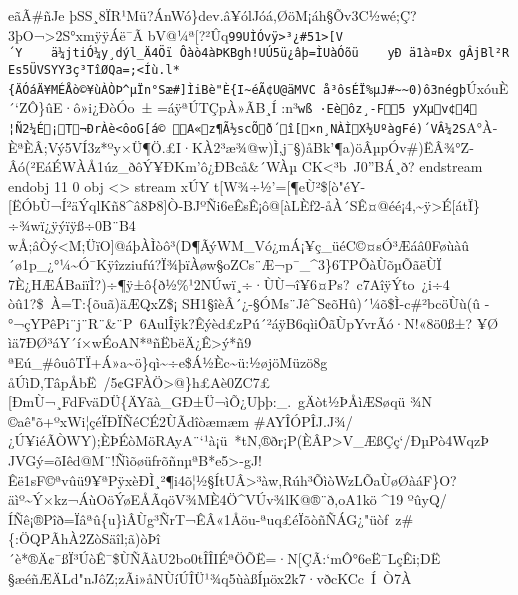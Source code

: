 \documentclass[
]{article}
\begin{document}
{eã\)Ã\#ñJe ­þSS¸8Ï­R¹Mü?ÁnWó\}dev.â¥ólJóá,ØöM¡áh§Õv3C½wé;Ç?3þO¬\textgreater2S°xmÿÿÁë¯Ã
bV@¼ª{[}?²Ûq\texttt{99UÌÓvÿ\textgreater{}³¿\#5\textquotesingle{}1\textgreater{}{[}V´Y\ \ \ \ ä¼jtiÓ¼y¸dýl\_Ä4Öï~Ôàò4àÞKBgh!UÚ5ü¿âþ=ÌUàÓõü\ \ \ \ yÐ\ ä1à¤Ðx\ gÂjBl²REs5ÜVSYY3ç³TîØQa=;\textless{}\textquotesingle{}Íù.l*\{ÄÓáÄ¥MÉÅò©¥ùÀÒ Þ\^{}µÏn°Sæ\#{]}ÌiBè"È\{I\textasciitilde{}éÃ¢U@äMVC\ å³ôsÉÏ\%µJ\#\textasciitilde{}\textasciitilde{}0)ô3négþ}ÚxóuÈ´`ZÔ\}ûE·ô»i¿ÐòÓo~± =áÿªÚTÇpÀ»ÃB¸Í :n³\texttt{wß\ ·Eèôz¸-F\textbar{}5~yXµv¢4¦Ñ2¼É¡T¬ÐrÀè\textless{}ôoG{[}á©~A«z¶Ã½scÕð´î{[}×n¸NÀÌX½UºàgFé)´VÂ¼2S}A°À­ÈªÈÂ;Vý5VÍ3z*ºy×Ü¶Ö.£I·KÀ2³æ¾@w)Ì,j¯§)åBk'­¶a)öÂµpÓv\#)ËÂ¾°Z­Âó(²EáÉWÀÅ1úz\_ðôÝ¥ÐKm'ô¿ÐBcå \&´WÀµ
 CK\textless³b~J0''BÁ¸ð?
endstream
endobj
11 0 obj
\textless{}\textgreater{}
stream
xÚY t{[}W¾÷½'={[}¶eÙ²\${[}ò"éY-{[}ËÓbÙ¬Í²äÝqlKñ8\^{}â8Þ8{]}Ò-BJºÑi6\textquotesingle eÊsÊ¡ô@{[}àLÈf2-åÀ´SÊ¤@éé¡4,\textasciitildeÿ\textgreater É{[}átÏ\}÷¾wï¿\textbar ÿýïÿß÷0B¨B4
wÅ;âÒý\textless M;ÜïO{]}@\textquotesingle áþÀÌòô³(D¶ÃýWM\_Vó¿mÁ¡¥ç\_üéC©¤sÓ³Æá\textquotesingle â0Føùàû´ø1p\_¿°¼\textasciitilde Ó¯Kÿîzziufú?Ï¾þïÀøw§oZCs¨Æ¬p¯\_\^{}3\}6TPÕàÙõµÕãëÙÏ 7È¿HÆÁBaiïÌ?)÷¶ÿ±ô\{ð½\%¹2NÚwï¸÷·ÙÙ¬î¥6¤Ps?~c7AîÿÝto~¿i÷4
òû1?\$~À=T:\{õuã)äÆQxZ\$¡ SH1§îèÂ´¿-§ÓMs¨Jê\^{}S¢õHû)´¼õ\$Ì\textbar{}-c\#²bcöÙ­ù(û -°¬çYP êPi¨j¨R¨\&¨P~6AulÎÿk?Êýèd£zPú´²áÿB6qìiÔãÙpYvrÃó·N!«8ö0ß±? ¥Ø
ìä7ÐØ³áY´í×wÉoAN*ªñËbëÄ¿Ê\textgreaterý*ñ9ªEú\_\#ôuôTÏ+Á»a\textasciitilde ö\}qì\textasciitilde÷e\$Á½Èc\textasciitilde ü:½øjöMüzö8g
åÚìD,TâpÅbË~\textquotesingle/5¢GFÀÖ\textgreater@\}h£Aè0ZC7£{[}ÐmÙ¬¸FdFväDÜ\{ÄYãà\_GÐ±Ü¬ìÕ¿Uþþ­:\_.~gÄòt½ÞÅìÆSøqü
¾N©aê"õ+ºxWi¦çéÏÐÏÑéCÉ2ÙÃdîòæmæm \#AYÎÓPÎJ.J¾/¿Ú¥iéÃÒWY);ÈÞÉòMöRAyA¨`¹à¡ü~*tN,\textbar®ðr¡P(ÈÂP\textgreaterV\_ÆßÇç`/ÐµPò4WqzÞ
JVGý=õIêd@M¨!ÑìõøüfrõñnµªB*e5\textgreater\textquotesingle-gJ!Êë1sF©ªvûü9¥ªPÿxèÐÌ¸²¶i4õ¦½§ÍtUÂ\textgreater³àw,Rúh³ÕìòWzLÕ­aÙøØàáF\}O?äìº\textasciitilde Ý×kz¬ÁùOöÝøEÅÃqöV¾MÈ4Ö\^{}VÚv¾lK@®¨ð,oA1kö \^{}19 ºûyQ/ÍÑ\textbar ê¡®Pî\textbar ð=Ïâªû\{u\}ìÂÙg³ÑrT¬ÊÂ«1Åöu-ªuq£éÏ\textbar õòñÑÁG¿"üòf~z\#\{:ÖQPÃhÀ2Zò Säîl;ã)òÞî´è*®Ä¢¯ßÏ³ÚòÊ¯\$ÙÑÃàU2bo0tÎÎIÉªÖÕË=·N{[}ÇÃ:`mÔ°6eË¯LçÊi;DË §æéñÆÄLd"­nJôZ;zÃi»åNÙí\textquotesingle ÚÎÜ¹¾q5ùàßÍµöx2k7·vðcK\textquotesingle\textbar Cc~Í~Ò7À
}
\end{document}
